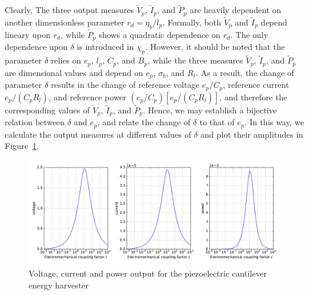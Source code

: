 \documentclass{article}
\begin{document}
Clearly, The three output measures $\tilde{V}_p$, $\tilde{I}_p$, and $\tilde{P}_p$ are heavily dependent on another dimensionless parameter $r_d = \eta_b/l_p$. Formally, both $\tilde{V}_p$ and $\tilde{I}_p$ depend lineary upon $r_d$, while $\tilde{P}_p$ shows a quadratic dependence on $r_d$. The only dependence upon $\delta$ is introduced in $\chi_p$. However, it should be noted that the parameter $\delta$ relies on $e_p$, $l_p$, $C_p$, and $B_p$, while the three measures $\tilde{V}_p$, $\tilde{I}_p$, and $\tilde{P}_p$ are dimensional values and depend on $e_p$, $\sigma_b$, and $R_l$. As a result, the change of parameter $\delta$ results in the change of reference voltage $e_p / C_p$, reference current $e_p / (C_p R_l)$, and reference power $(e_p / C_p)[e_p / (C_p R_l)]$, and therefore the corresponding values of $\tilde{V}_p$, $\tilde{I}_p$, and $\tilde{P}_p$. Hence, we may establish a bijective relation between $\delta$ and $e_p$, and relate the change of $\delta$ to that of $e_p$. In this way, we calculate the output measures at different values of $\delta$ and plot their amplitudes in Figure~\ref{fig:fig_sol_analytic_perf_fun}. 
\begin{figure}[!htbp]
    \centering
    \includegraphics[width=\textwidth]{./img_eig_asy/fig_sol_analytic_perf_fun}
    \caption{Voltage, current and power output for the piezoelectric cantilever energy harvester}
    \label{fig:fig_sol_analytic_perf_fun}
\end{figure}
\end{document}
